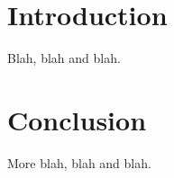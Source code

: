 \documentclass[twoside]{article}
\date{June 1996}
\author{Joe A. Uthor and Jane E. Ditor}
\makeatletter
\newcommand{\showabstract}{%
   \noindent
   \sf@Abstract}
\newcommand{\ReportDescription}{%
   \global\let\thanks\@gobble
   \MakeRptDocPage
   \global\let\thanks\relax}
\makeatother
\begin{document}

\maketitle\thispagestyle{empty}
\begin{abstract}
 \showabstract
\end{abstract}

\ReportDescription

\tableofcontents
\cleardoublepage
{}
\setcounter{page}{1}

\section{Introduction}

Blah, blah and blah.

\section{Conclusion}

More blah, blah and blah.
\end{document}
